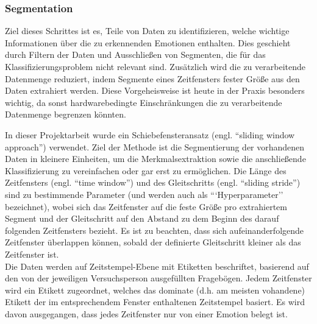 \subsubsection{Segmentation} \label{segmentation-subsubsec}


Ziel dieses Schrittes ist es, Teile von Daten zu identifizieren, welche wichtige Informationen über die zu erkennenden Emotionen enthalten. 
Dies geschieht durch Filtern der Daten und Ausschließen von Segmenten, die für das Klassifizierungsproblem nicht relevant sind.
Zusätzlich wird die zu verarbeitende Datenmenge reduziert, indem Segmente eines Zeitfensters fester Größe aus den Daten extrahiert werden.
Diese Vorgeheisweise ist heute in der Praxis besonders wichtig, da sonst hardwarebedingte Einschränkungen die zu verarbeitende Datenmenge begrenzen könnten. \\


In dieser Projektarbeit wurde ein Schiebefensteransatz (engl. ``sliding window approach'') verwendet. 
Ziel der Methode ist die Segmentierung der vorhandenen Daten in kleinere Einheiten, um die Merkmalsextraktion sowie die anschließende Klassifizierung zu vereinfachen oder gar erst zu ermöglichen.
Die Länge des Zeitfensters (engl. ``time window'') und des Gleitschritts (engl. ``sliding stride'') sind zu bestimmende Parameter (und werden auch als ```Hyperparameter'' bezeichnet), wobei sich das Zeitfenster auf die feste Größe pro extrahiertem Segment und der Gleitschritt auf den Abstand zu dem Beginn des darauf folgenden Zeitfensters bezieht.
Es ist zu beachten, dass sich aufeinanderfolgende Zeitfenster überlappen können, sobald der definierte Gleitschritt kleiner als das Zeitfenster ist. \\


Die Daten werden auf Zeitstempel-Ebene mit Etiketten beschriftet, basierend auf den von der jeweiligen Versuchsperson ausgefüllten Fragebögen. 
Jedem Zeitfenster wird ein Etikett zugeordnet, welches das dominate (d.h. am meisten vohandene) Etikett der im entsprechendem Fenster enthaltenen Zeitstempel basiert. Es wird davon ausgegangen, dass jedes Zeitfenster nur von einer Emotion belegt ist. \\


